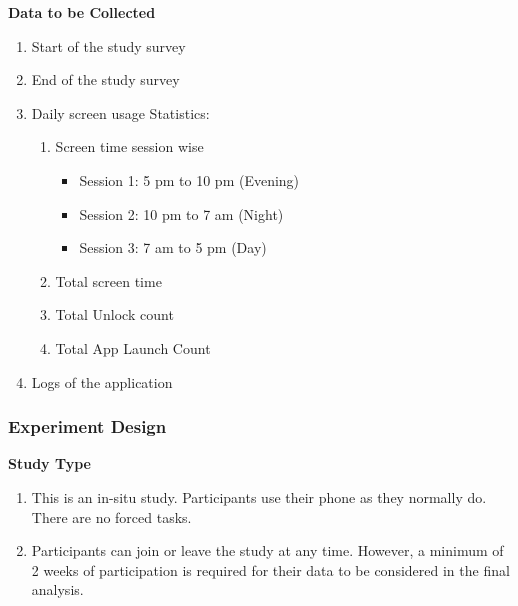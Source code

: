\documentclass{article}
\begin{document}
\textbf{Data to be Collected}
\begin{enumerate}
    \item Start of the study survey
    \item End of the study survey
    \item Daily screen usage Statistics:
    \begin{enumerate}
        \item Screen time session wise
        \begin{itemize}
            \item Session 1: 5 pm to 10 pm (Evening)
            \item Session 2: 10 pm to 7 am (Night)
            \item Session 3: 7 am to 5 pm (Day)
        \end{itemize}
        \item Total screen time
        \item Total Unlock count
        \item Total App Launch Count
    \end{enumerate}
    \item Logs of the application
\end{enumerate}

\subsubsection{Experiment Design}

\textbf{Study Type}
\begin{enumerate}
    \item This is an in-situ study. Participants use their phone as they normally do. There are no forced tasks.
    \item Participants can join or leave the study at any time. However, a minimum of 2 weeks of participation is required for their data to be considered in the final analysis.
\end{enumerate}
\end{document}
